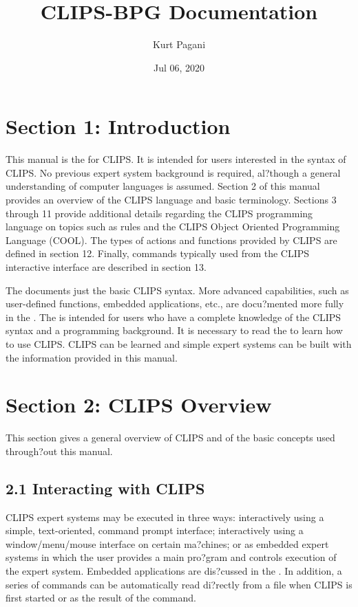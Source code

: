 \documentclass[letterpaper,10pt,english]{sphinxmanual}
\title{CLIPS-BPG Documentation}
\date{Jul 06, 2020}
\author{Kurt Pagani}
\begin{document}
\pagestyle{empty}
\sphinxmaketitle
\pagestyle{plain}
\sphinxtableofcontents
\pagestyle{normal}
\label{\detokenize{index::doc}}



\chapter{Section 1: Introduction}
\label{\detokenize{introduction:section-1-introduction}}\label{\detokenize{introduction::doc}}
This manual is the  for CLIPS. It is intended
for users interested in the syntax of CLIPS. No previous expert system
background is required, al?though a general understanding of computer
languages is assumed. Section 2 of this manual provides an overview of
the CLIPS language and basic terminology. Sections 3 through 11 provide
additional details regarding the CLIPS programming language on topics
such as rules and the CLIPS Object Oriented Programming Language (COOL).
The types of actions and functions provided by CLIPS are defined in
section 12. Finally, commands typically used from the CLIPS interactive
interface are described in section 13.

The  documents just the basic CLIPS syntax.
More advanced capabilities, such as user-defined functions, embedded
applications, etc., are docu?mented more fully in the . The  is intended for
users who have a complete knowledge of the CLIPS syntax and a
programming background. It is  necessary to read the  to learn how to use CLIPS. CLIPS can be learned and
simple expert systems can be built with the information provided in this
manual.


\chapter{Section 2: CLIPS Overview}
\label{\detokenize{overview:section-2-clips-overview}}\label{\detokenize{overview::doc}}
This section gives a general overview of CLIPS and of the basic concepts
used through?out this manual.


\section{2.1 Interacting with CLIPS}
\label{\detokenize{overview:interacting-with-clips}}
CLIPS expert systems may be executed in three ways: interactively using
a simple, text-oriented, command prompt interface; interactively using a
window/menu/mouse interface on certain ma?chines; or as embedded expert
systems in which the user provides a main pro?gram and controls
execution of the expert system. Embedded applications are dis?cussed in
the . In addition, a series of commands can
be automatically read di?rectly from a file when CLIPS is first started
or as the result of the  command.
\end{document}

